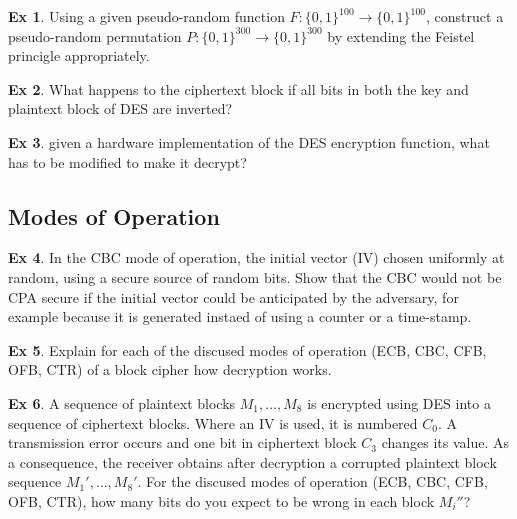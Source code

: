 \documentclass[10pt,\jkfside,a4paper]{article}
\theoremstyle{definition}
\newtheorem{ex}{Ex}
\begin{document}

\begin{ex}

    Using a given pseudo-random function $F: \{0, 1\}^{100} \to \{0, 1\}^{100}$, construct a pseudo-random permutation $P: \{0, 1\}^{300} \to \{0, 1\}^{300}$ by extending the Feistel princigle appropriately.

\end{ex}


\begin{ex}

    What happens to the ciphertext block if all bits in both the key and plaintext block of DES are inverted?

\end{ex}


\begin{ex}

    given a hardware implementation of the DES encryption function, what has to be modified to make it decrypt?

\end{ex}


\subsection{Modes of Operation}

\begin{ex}

    In the CBC mode of operation, the initial vector (IV) chosen uniformly at random, using a secure source of random bits. Show that the CBC would not be CPA secure if the initial vector could be anticipated by the adversary, for example because it is generated instaed of using a counter or a time-stamp.

\end{ex}


\begin{ex}

    Explain for each of the discused modes of operation (ECB, CBC, CFB, OFB, CTR) of a block cipher how decryption works.

\end{ex}


\begin{ex}

    A sequence of plaintext blocks $M_1, \ldots, M_8$ is encrypted using DES into a sequence of ciphertext blocks. Where an IV is used, it is numbered $C_0$. A transmission error occurs and one bit in ciphertext block $C_3$ changes its value. As a consequence, the receiver obtains after decryption a corrupted plaintext block sequence $M_1', \ldots, M_8'$. For the discused modes of operation (ECB, CBC, CFB, OFB, CTR), how many bits do you expect to be wrong in each block $M_i''$?

\end{ex}
\end{document}
